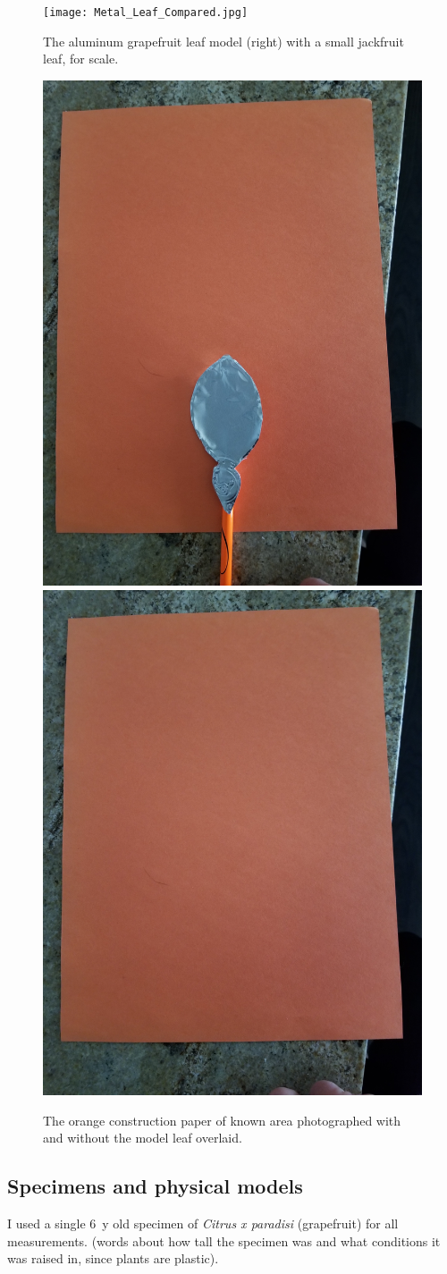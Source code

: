 \documentclass{article}
\begin{document}
\begin{figure}
\begin{center}
\texttt{[image: Metal\_Leaf\_Compared.jpg]}
\end{center}
\caption{The aluminum grapefruit leaf model (right) with a small jackfruit leaf, for scale.}
\label{fig:methods3}
\end{figure}

\begin{figure}
\begin{center}
\includegraphics[width=0.33\columnwidth]{MetalLeaf.jpg}
\includegraphics[width=0.33\columnwidth]{Paper.jpg}
\end{center}
\caption{The orange construction paper of known area photographed with and without the model leaf overlaid.}
\label{fig:methods4}
\end{figure}

\subsection{Specimens and physical models}
I used a single \SI{6}{y} old specimen of \emph{Citrus x paradisi} (grapefruit) for all measurements. (words about how tall the specimen was and what conditions it was raised in, since plants are plastic). 
\end{document}
